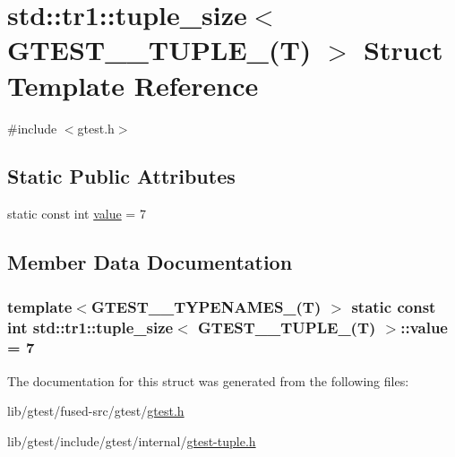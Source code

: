 \hypertarget{structstd_1_1tr1_1_1tuple__size_3_01_g_t_e_s_t__7___t_u_p_l_e___07_t_08_01_4}{\section{std\-:\-:tr1\-:\-:tuple\-\_\-size$<$ G\-T\-E\-S\-T\-\_\-\_\-\-T\-U\-P\-L\-E\-\_\-(T) $>$ Struct Template Reference}
\label{structstd_1_1tr1_1_1tuple__size_3_01_g_t_e_s_t__7___t_u_p_l_e___07_t_08_01_4}
}


{\ttfamily \#include $<$gtest.\-h$>$}

\subsection*{Static Public Attributes}
\begin{DoxyCompactItemize}
\item 
static const int \hyperlink{structstd_1_1tr1_1_1tuple__size_3_01_g_t_e_s_t__7___t_u_p_l_e___07_t_08_01_4_a5f6f9ec64f789f198b2481a512cc8c4a}{value} = 7
\end{DoxyCompactItemize}


\subsection{Member Data Documentation}
\hypertarget{structstd_1_1tr1_1_1tuple__size_3_01_g_t_e_s_t__7___t_u_p_l_e___07_t_08_01_4_a5f6f9ec64f789f198b2481a512cc8c4a}{
\subsubsection[{value}]{\setlength{\rightskip}{0pt plus 5cm}template$<$G\-T\-E\-S\-T\-\_\-\_\-\-T\-Y\-P\-E\-N\-A\-M\-E\-S\-\_\-(\-T) $>$ static const int {\bf std\-::tr1\-::tuple\-\_\-size}$<$ {\bf G\-T\-E\-S\-T\-\_\-\_\-\-T\-U\-P\-L\-E\-\_\-}(T) $>$\-::value = 7\hspace{0.3cm}{\ttfamily [static]}}}\label{structstd_1_1tr1_1_1tuple__size_3_01_g_t_e_s_t__7___t_u_p_l_e___07_t_08_01_4_a5f6f9ec64f789f198b2481a512cc8c4a}


The documentation for this struct was generated from the following files\-:\begin{DoxyCompactItemize}
\item 
lib/gtest/fused-\/src/gtest/\hyperlink{fused-src_2gtest_2gtest_8h}{gtest.\-h}\item 
lib/gtest/include/gtest/internal/\hyperlink{gtest-tuple_8h}{gtest-\/tuple.\-h}\end{DoxyCompactItemize}
